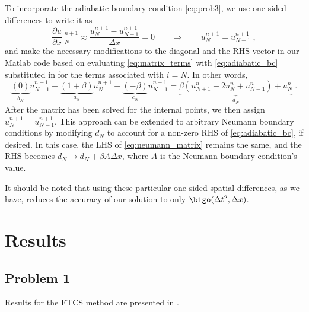 \documentclass[11pt]{article}
\begin{document}
To incorporate the adiabatic boundary condition \eqref{eq:prob3}, we use one-sided differences to write it as
\begin{equation}
\frac{\partial u}{\partial x} \Big|_N^{n+1} \approx \frac{u_N^{n+1} - u_{N-1}^{n+1}}{\Delta x} = 0
\qquad \Rightarrow \qquad
u_N^{n+1} = u_{N-1}^{n+1}
\;,
\label{eq:adiabatic_bc}
\end{equation}
and make the necessary modifications to the diagonal and the RHS vector in our Matlab code based on evaluating \eqref{eq:matrix_terms} with \eqref{eq:adiabatic_bc} substituted in for the terms associated with $i=N$. In other words,
\begin{equation}
  \underbrace{\left(           0 \right)}_{b_N} u_{N-1}^{n+1}
+ \underbrace{\left( 1 +   \beta \right)}_{a_N} u_N^{n+1}
+ \underbrace{\left(      -\beta \right)}_{c_N} u_{N+1}^{n+1}
=
\underbrace{\beta \left( u_{N+1}^n - 2 u_N^n + u_{N-1}^n \right) + u_N^n}_{d_N}
\;.
\label{eq:neumann_matrix}
\end{equation}
After the matrix has been solved for the internal points, we then assign $u_N^{n+1} = u_{N-1}^{n+1}$. This approach can be extended to arbitrary Neumann boundary conditions by modifying $d_N$ to account for a non-zero RHS of \eqref{eq:adiabatic_bc}, if desired. In this case, the LHS of \eqref{eq:neumann_matrix} remains the same, and the RHS becomes $d_N \rightarrow d_N + \beta A \Delta x$, where $A$ is the Neumann boundary condition's value.

It should be noted that using these particular one-sided spatial differences, as we have, reduces the accuracy of our solution to only $\bigo(\Delta t^2, \Delta x)$.

\section{Results} %

\subsection{Problem 1}

Results for the FTCS method are presented in .
\end{document}
